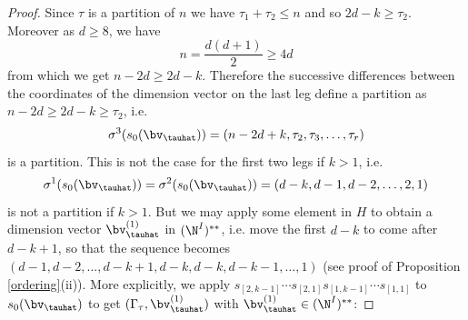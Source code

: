 \begin{proof}
	Since $\tau$ is a partition of $n$ we have $\tau_1+\tau_2\leq n$ and so  $2d-k\geq\tau_2$. Moreover as $d\geq 8$, we have
	\begin{equation}
		n=\frac{d(d+1)}{2}\geq 4d
		\label{eq1}\end{equation}
	from which we get $n-2d\geq 2d-k$. Therefore the successive differences between the coordinates of the dimension vector on the last leg define a partition as $n-2d\geq 2d-k\geq\tau_2$, i.e. $$\sigma^3(s_0(\bv_\tauhat))=(n-2d+k,\tau_2, \tau_3, \ldots, \tau_r)$$ is a partition. This is not the case for the first two legs if $k>1$, i.e. $$\sigma^1(s_0(\bv_\tauhat))=\sigma^2(s_0(\bv_\tauhat))=(d-k,d-1,d-2,\ldots , 2,1)$$ is not a partition if $k>1$. But  we may apply some element in $H$ to obtain a dimension vector $\bv^{(1)}_\tauhat$ in $(\N^I)^{**}$, i.e. move the first $d-k$ to come after $d-k+1$, so that the sequence becomes $(d-1,d-2, \ldots , d-k+1,d-k,d-k,d-k-1, \ldots,1)$ (see proof of Proposition \ref{ordering}(ii)).
	More explicitly, we apply $s_{[2,k-1]}\cdots s_{[2,1]}s_{[1,k-1]}\cdots s_{[1,1]}$ to $s_0(\bv_{\tauhat})$ to  get $(\Gamma_\tau,\bv^{(1)}_\tauhat)$ with $\bv^{(1)}_\tauhat\in (\N^I)^{**}$:   
	
	
	
	
	

\end{proof}
